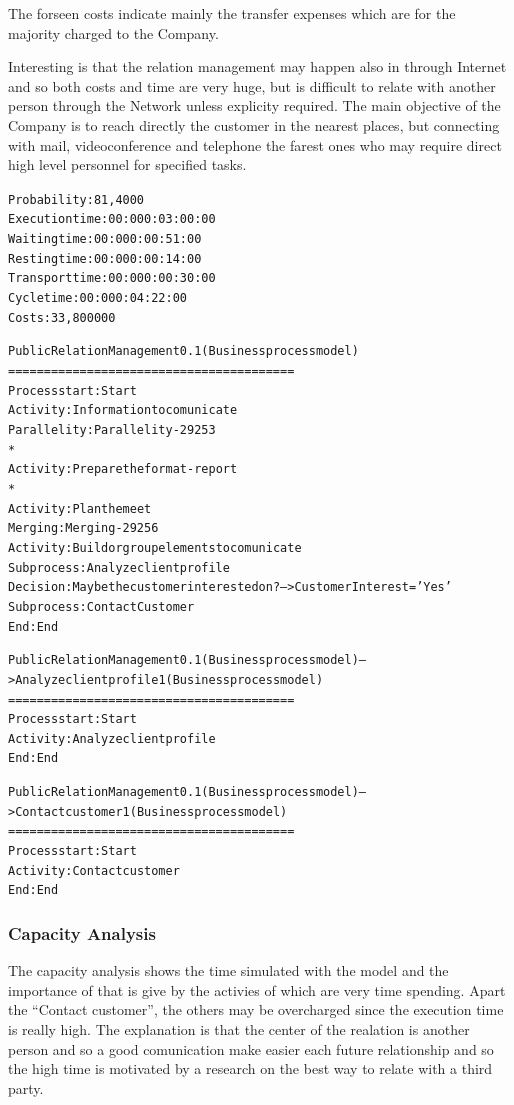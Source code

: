 The forseen costs indicate mainly the transfer expenses which are for the majority charged to the Company.

Interesting is that the relation management may happen also in through Internet and so both costs and time are very huge, but is difficult to relate with another person through the Network unless explicity required. The main objective of the Company is to reach directly the customer in the nearest places, but connecting with mail, videoconference and telephone the farest ones who may require direct high level personnel for specified tasks.

\begin{alltt}
Probability:   81,4000%
Execution time:  00:000:03:00:00
Waiting time:  00:000:00:51:00
Resting time:  00:000:00:14:00
Transport time:  00:000:00:30:00
Cycle time:  00:000:04:22:00
Costs:  33,800000

Public Relation Management 0.1 (Business process model)
========================================
Process start: Start
Activity: Information to comunicate
Parallelity: Parallelity-29253
    *
    Activity: Prepare the format - report
    *
    Activity: Plan the meet
Merging: Merging-29256
Activity: Build or group elements to comunicate
Subprocess: Analyze client profile
Decision: May be the customer interested on? --> CustomerInterest = 'Yes'
Subprocess: Contact Customer
End: End

Public Relation Management 0.1 (Business process model) --> Analyze client profile 1 (Business process model)
========================================
Process start: Start
Activity: Analyze client profile
End: End

Public Relation Management 0.1 (Business process model) --> Contact customer 1 (Business process model)
========================================
Process start: Start
Activity: Contact customer
End: End
\end{alltt}


\subsubsection{Capacity Analysis}
The capacity analysis shows the time simulated with the model and the importance of that is give by the activies of which are very time spending. Apart the ``Contact customer'', the others may be overcharged since the execution time is really high. The explanation is that the center of the realation is another person and so a good comunication make easier each future relationship and so the high time is motivated by a research on the best way to relate with a third party.

